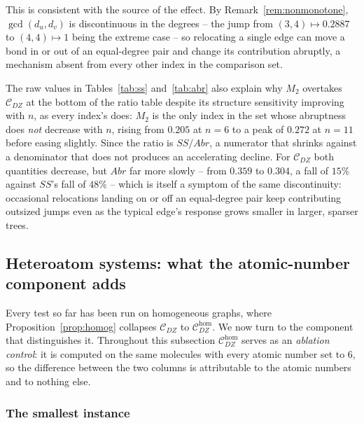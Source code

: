 \documentclass[11pt,a4paper]{article}
\theoremstyle{plain}
\theoremstyle{definition}
\theoremstyle{remark}
\newcommand{\CDZ}{\mathcal{C}_{DZ}}
\newcommand{\CDZhom}{\mathcal{C}_{DZ}^{\mathrm{hom}}}
\newcommand{\gcdd}{\operatorname{gcd}}
\begin{document}
This is consistent with the source of the effect. By
Remark~\ref{rem:nonmonotone}, $\gcdd(d_u,d_v)$ is discontinuous in the degrees --
the jump from $(3,4)\mapsto0.2887$ to $(4,4)\mapsto1$ being the extreme case --
so relocating a single edge can move a bond in or out of an equal-degree pair and
change its contribution abruptly, a mechanism absent from every other index in
the comparison set.

The raw values in Tables~\ref{tab:ss} and~\ref{tab:abr} also explain why $M_2$
overtakes $\CDZ$ at the bottom of the ratio table despite its structure
sensitivity improving with $n$, as every index's does: $M_2$ is the only index in
the set whose abruptness does \emph{not} decrease with $n$, rising from $0.205$
at $n=6$ to a peak of $0.272$ at $n=11$ before easing slightly. Since the ratio
is $SS/Abr$, a numerator that shrinks against a denominator that does not
produces an accelerating decline. For $\CDZ$ both quantities decrease, but
$Abr$ far more slowly -- from $0.359$ to $0.304$, a fall of $15\%$ against
$SS$'s fall of $48\%$ -- which is itself a symptom of the same discontinuity:
occasional relocations landing on or off an equal-degree pair keep contributing
outsized jumps even as the typical edge's response grows smaller in larger,
sparser trees.

\subsection{Heteroatom systems: what the atomic-number component adds}
\label{sec:hetero}

Every test so far has been run on homogeneous graphs, where
Proposition~\ref{prop:homog} collapses $\CDZ$ to $\CDZhom$. We now turn to the
component that distinguishes it. Throughout this subsection $\CDZhom$ serves as
an \emph{ablation control}: it is computed on the same molecules with every
atomic number set to $6$, so the difference between the two columns is
attributable to the atomic numbers and to nothing else.

\subsubsection*{The smallest instance}
\end{document}
